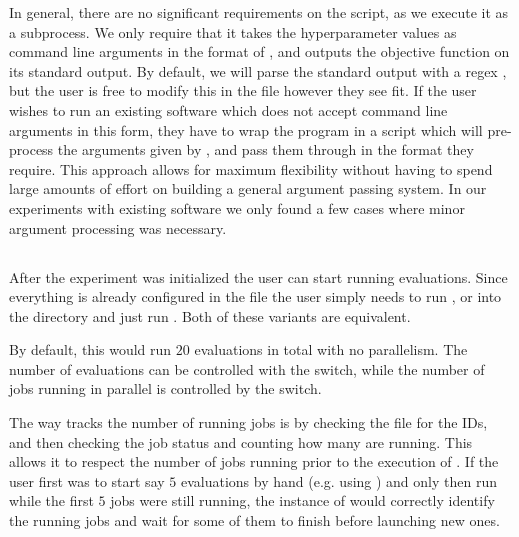 In general, there are no significant requirements on the script, as we execute it as a subprocess. We only require that it takes the hyperparameter values as command line arguments in the format of , and outputs the objective function on its standard output. By default, we will parse the standard output with a regex , but the user is free to modify this in the  file however they see fit. If the user wishes to run an existing software which does not accept command line arguments in this form, they have to wrap the program in a script which will pre-process the arguments given by \bopt, and pass them through in the format they require. This approach allows for maximum flexibility without having to spend large amounts of effort on building a general argument passing system. In our experiments with existing software we only found a few cases where minor argument processing was necessary.

\subsection{}

After the experiment was initialized the user can start running evaluations. Since everything is already configured in the  file the user simply needs to run , or  into the directory and just run . Both of these variants are equivalent.

By default, this would run $20$ evaluations in total with no parallelism. The number of evaluations can be controlled with the  switch, while the number of jobs running in parallel is controlled by the  switch.

The way  tracks the number of running jobs is by checking the  file for the IDs, and then checking the job status and counting how many are running. This allows it to respect the number of jobs running prior to the execution of . If the user first was to start say $5$ evaluations by hand (e.g. using ) and only then run  while the first $5$ jobs were still running, the instance of  would correctly identify the running jobs and wait for some of them to finish before launching new ones.

